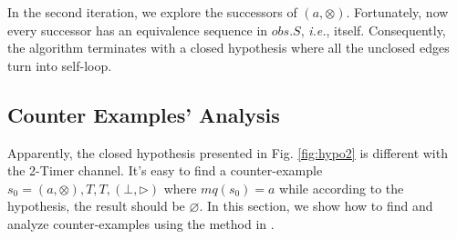 \documentclass[conference, a4paper]{IEEEtran}
\newcommand{\rblock}[0]{\circleddash}
\newcommand{\rread}[0]{\rhd}
\newcommand{\rnoread}[0]{\otimes}
\newcommand{\rempty}[0]{\varnothing}
\begin{document}
In the second iteration, we explore the successors of $(a,\rnoread)$. Fortunately, now every
successor has an equivalence sequence in $obs.S$, \emph{i.e.}, itself. Consequently, the algorithm terminates
with a closed hypothesis where all the unclosed edges turn into
self-loop.


\subsection{Counter Examples' Analysis} 
Apparently, the closed hypothesis presented in Fig. \ref{fig:hypo2} is different with the 2-Timer
channel. It's easy to find a counter-example $s_0=(a,\rnoread),T,T,(\bot,\rread)$ where $mq(s_0)=a$ while
according to the hypothesis, the result should be $\rempty$. In this section, we show how to
find and analyze counter-examples using the method in \cite{DBLP:conf/sfm/SteffenHM11}. 
\end{document}
